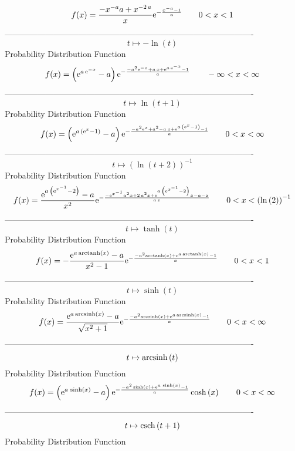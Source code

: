 \documentclass[12pt]{article}
\begin{document}
$$  f(x)={\frac {-{x}^{-a}a+{x}^{-2\,a}}{x}{{\rm e}^{-{\frac {{x}^{-a}-1}{a}}}}
}
 \qquad0
 < x < 1
$$-------------------------------------------------------------------------------------------  \\$$t\mapsto -\ln  \left( t \right) 
$$Probability Distribution Function 
$$  f(x)= \left( {{\rm e}^{a\,{{\rm e}^{-x}}}}-a \right) {{\rm e}^{-{\frac {-{a
}^{2}{{\rm e}^{-x}}+a\,x+{{\rm e}^{a\,{{\rm e}^{-x}}}}-1}{a}}}}
 \qquad-\infty 
 < x < \infty 
$$-------------------------------------------------------------------------------------------  \\$$t\mapsto \ln  \left( t+1 \right) 
$$Probability Distribution Function 
$$  f(x)= \left( {{\rm e}^{a\, \left( {{\rm e}^{x}}-1 \right) }}-a \right) {
{\rm e}^{-{\frac {-{a}^{2}{{\rm e}^{x}}+{a}^{2}-a\,x+{{\rm e}^{a\,
 \left( {{\rm e}^{x}}-1 \right) }}-1}{a}}}}
 \qquad0
 < x < \infty 
$$-------------------------------------------------------------------------------------------  \\$$t\mapsto  \left( \ln  \left( t+2 \right)  \right) ^{-1}
$$Probability Distribution Function 
$$  f(x)={\frac {{{\rm e}^{a\, \left( {{\rm e}^{{x}^{-1}}}-2 \right) }}-a}{{x}^
{2}}{{\rm e}^{-{\frac {-{{\rm e}^{{x}^{-1}}}{a}^{2}x+2\,{a}^{2}x+{
{\rm e}^{a\, \left( {{\rm e}^{{x}^{-1}}}-2 \right) }}x-a-x}{a\,x}}}}}
 \qquad0
 < x <  \left( \ln  \left( 2 \right)  \right) ^{-1}
$$-------------------------------------------------------------------------------------------  \\$$t\mapsto \tanh \left( t \right) 
$$Probability Distribution Function 
$$  f(x)=-{\frac {{{\rm e}^{a\,{\rm arctanh} \left(x\right)}}-a}{{x}^{2}-1}{
{\rm e}^{-{\frac {-{a}^{2}{\rm arctanh} \left(x\right)+{{\rm e}^{a\,
{\rm arctanh} \left(x\right)}}-1}{a}}}}}
 \qquad0
 < x < 1
$$-------------------------------------------------------------------------------------------  \\$$t\mapsto \sinh \left( t \right) 
$$Probability Distribution Function 
$$  f(x)={\frac {{{\rm e}^{a\,{\rm arcsinh} \left(x\right)}}-a}{\sqrt {{x}^{2}+
1}}{{\rm e}^{-{\frac {-{a}^{2}{\rm arcsinh} \left(x\right)+{{\rm e}^{a
\,{\rm arcsinh} \left(x\right)}}-1}{a}}}}}
 \qquad0
 < x < \infty 
$$-------------------------------------------------------------------------------------------  \\$$t\mapsto {\rm arcsinh} \left(t\right)
$$Probability Distribution Function 
$$  f(x)= \left( {{\rm e}^{a\,\sinh \left( x \right) }}-a \right) {{\rm e}^{-{
\frac {-{a}^{2}\sinh \left( x \right) +{{\rm e}^{a\,\sinh \left( x
 \right) }}-1}{a}}}}\cosh \left( x \right) 
 \qquad0
 < x < \infty 
$$-------------------------------------------------------------------------------------------  \\$$t\mapsto {\rm csch} \left(t+1\right)
$$Probability Distribution Function 
\end{document}
